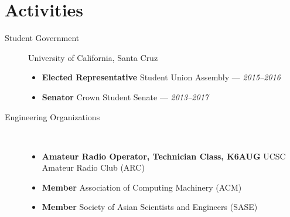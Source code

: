 \documentclass[10pt]{article}
\begin{document}
\section*{Activities}
\begin{description}
  \item[Student Government] University of California, Santa Cruz
    \begin{itemize}
      \item \textbf{Elected Representative} Student Union Assembly --- \textit{2015--2016}
      \item \textbf{Senator} Crown Student Senate --- \textit{2013--2017}
    \end{itemize}
  \item[Engineering Organizations] ~
    \begin{itemize}
      \item \textbf{Amateur Radio Operator, Technician Class, K6AUG} UCSC Amateur Radio Club (ARC)
      \item \textbf{Member} Association of Computing Machinery (ACM)
      \item \textbf{Member} Society of Asian Scientists and Engineers (SASE)
    \end{itemize}
\end{description}
\begin{comment}
  \item[Volunteering] ~
  \begin{itemize}
  \item \textbf{Marketing Communications Chairperson} San Francisco
  Fil-Am Lions Club --- \textit{2015-current}
  \item \textbf{Associate Member} Silicon Valley Cyber Lions Club ---
  \textit{2016--current}
  \end{itemize}
\end{comment}
\end{document}
